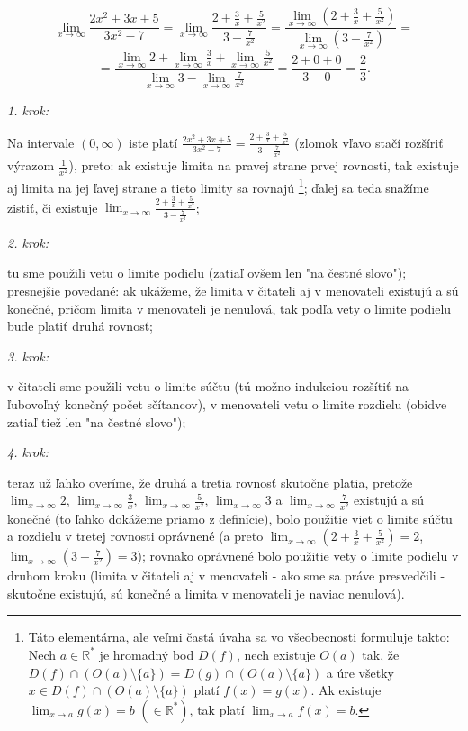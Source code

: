 \begin{center}
$$\lim_{x \rightarrow \infty} \frac{2x^2+3x+5}{3x^2-7}=\lim_{x \rightarrow \infty} \frac{2+\frac{3}{x}+\frac{5}{x^2}}{3-\frac{7}{x^2}}=\frac{\lim_{x \rightarrow \infty} (2+\frac{3}{x}+\frac{5}{x^2})}{\lim_{x \rightarrow \infty} (3-\frac{7}{x^2})}=$$
$$=\frac{\lim_{x \rightarrow \infty} 2+\lim_{x \rightarrow \infty}\frac{3}{x}+\lim_{x \rightarrow \infty} \frac{5}{x^2}}{\lim_{x \rightarrow \infty}3-\lim_{x \rightarrow \infty}\frac{7}{x^2}}=\frac{2+0+0}{3-0}=\frac{2}{3}.$$
\end{center}

\textit{1. krok:}

Na intervale $(0,\infty)$ iste platí $\frac{2x^2+3x+5}{3x^2-7}=\frac{2+\frac{3}{x}+\frac{5}{x^2}}{3-\frac{7}{x^2}}$ (zlomok vľavo stačí rozšíriť výrazom $\frac{1}{x^2}$), preto: ak existuje limita na pravej strane prvej rovnosti, tak existuje aj limita na jej ľavej strane a tieto limity sa rovnajú \footnote{Táto elementárna, ale veľmi častá úvaha sa vo všeobecnosti formuluje takto: Nech $a \in \mathbb{R^*}$ je hromadný bod $D(f)$, nech existuje $O(a)$ tak, že $D(f) \cap (O(a) \setminus \{ a\})=D(g) \cap (O(a) \setminus \{ a\})$ a úre všetky $x \in D(f) \cap (O(a) \setminus \{ a\})$ platí $f(x)=g(x)$. Ak existuje $\lim_{x \rightarrow a} g(x)=b$ $(\in \mathbb{R^*})$, tak platí $\lim_{x \rightarrow a} f(x)=b$.}; ďalej sa teda snažíme zistiť, či existuje $\lim_{x \rightarrow \infty}\frac{2+\frac{3}{x}+\frac{5}{x^2}}{3-\frac{7}{x^2}}$;

\textit{2. krok:}

tu sme použili vetu o limite podielu (zatiaľ ovšem len "na čestné slovo"); presnejšie povedané: ak ukážeme, že limita v čitateli aj v menovateli existujú a sú konečné, pričom limita v menovateli je nenulová, tak podľa vety o limite podielu bude platiť druhá rovnosť;

\textit{3. krok:}

v čitateli sme použili vetu o limite súčtu (tú možno indukciou rozšítiť na ľubovoľný konečný počet sčítancov), v menovateli vetu o limite rozdielu (obidve zatiaľ tiež len "na čestné slovo");

\textit{4. krok:}

teraz už ľahko overíme, že druhá a tretia rovnosť skutočne platia, pretože $\lim_{x \rightarrow \infty} 2$, $\lim_{x \rightarrow \infty} \frac{3}{x}$, $\lim_{x \rightarrow \infty} \frac{5}{x^2}$, $\lim_{x \rightarrow \infty} 3$ a $\lim_{x \rightarrow \infty} \frac{7}{x^2}$ existujú a sú konečné (to ľahko dokážeme priamo z definície), bolo použitie viet o limite súčtu a rozdielu v tretej rovnosti oprávnené (a preto $\lim_{x \rightarrow \infty} (2+\frac{3}{x}+\frac{5}{x^2})=2$, $\lim_{x \rightarrow \infty} (3-\frac{7}{x^2})=3$); rovnako oprávnené bolo použitie vety o limite podielu v druhom kroku (limita v čitateli aj v menovateli - ako sme sa práve presvedčili - skutočne existujú, sú konečné a limita v menovateli je naviac nenulová).

